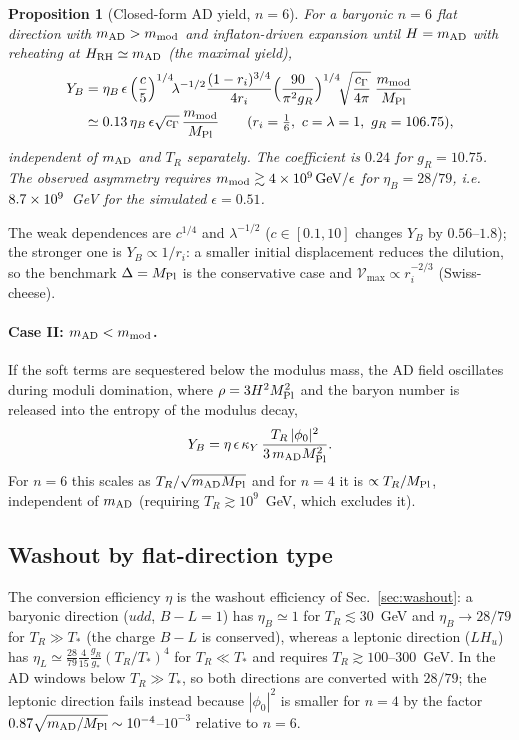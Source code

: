\documentclass[11pt]{article}
\newtheorem{proposition}{Proposition}
\newcommand{\MP}{M_{\rm Pl}}
\begin{document}
\begin{proposition}[Closed-form AD yield, $n=6$]\label{prop:AD}
For a baryonic $n=6$ flat direction with $m_{\rm AD}>m_{\rm mod}$ and inflaton-driven expansion until $H=m_{\rm AD}$ with reheating at $H_{\rm RH}\simeq m_{\rm AD}$ (the maximal yield),
\begin{align}
Y_B&=\eta_B\,\epsilon\,\Big(\frac c5\Big)^{1/4}\!\lambda^{-1/2}\frac{(1-r_i)^{3/4}}{4r_i}\Big(\frac{90}{\pi^2g_R}\Big)^{1/4}\!\sqrt{\frac{c_\Gamma}{4\pi}}\;\frac{m_{\rm mod}}{\MP}\nonumber\\
&\simeq0.13\,\eta_B\,\epsilon\sqrt{c_\Gamma}\,\frac{m_{\rm mod}}{\MP}\qquad(r_i=\tfrac16,\ c=\lambda=1,\ g_R=106.75),
\end{align}
independent of $m_{\rm AD}$ and $T_R$ separately. The coefficient is $0.24$ for $g_R=10.75$. The observed asymmetry requires $m_{\rm mod}\gtrsim4\times10^{9}\,\mathrm{GeV}/\epsilon$ for $\eta_B=28/79$, i.e.\ $8.7\times10^{9}$~GeV for the simulated $\epsilon=0.51$.
\end{proposition}
The weak dependences are $c^{1/4}$ and $\lambda^{-1/2}$ ($c\in[0.1,10]$ changes $Y_B$ by $0.56$--$1.8$); the stronger one is $Y_B\propto1/r_i$: a smaller initial displacement reduces the dilution, so the benchmark $\Delta=\MP$ is the conservative case and $\mathcal V_{\max}\propto r_i^{-2/3}$ (Swiss-cheese).

\paragraph{Case II: $m_{\rm AD}<m_{\rm mod}$.} If the soft terms are sequestered below the modulus mass, the AD field oscillates during moduli domination, where $\rho=3H^2\MP^2$ and the baryon number is released into the entropy of the modulus decay,
\begin{equation}
Y_B=\eta\,\epsilon\,\kappa_Y\,\frac{T_R\,|\phi_0|^2}{3\,m_{\rm AD}\MP^2}.\label{eq:YBII}
\end{equation}
For $n=6$ this scales as $T_R/\sqrt{m_{\rm AD}\MP}$ and for $n=4$ it is $\propto T_R/\MP$, independent of $m_{\rm AD}$ (requiring $T_R\gtrsim10^{9}$~GeV, which excludes it).

\subsection{Washout by flat-direction type}
The conversion efficiency $\eta$ is the washout efficiency of Sec.~\ref{sec:washout}: a baryonic direction ($udd$, $B-L=1$) has $\eta_B\simeq1$ for $T_R\lesssim30$~GeV and $\eta_B\to28/79$ for $T_R\gg T_*$ (the charge $B-L$ is conserved), whereas a leptonic direction ($LH_u$) has $\eta_L\simeq\tfrac{28}{79}\tfrac{4}{15}\tfrac{g_R}{g_*}(T_R/T_*)^4$ for $T_R\ll T_*$ and requires $T_R\gtrsim100$--$300$~GeV. In the AD windows below $T_R\gg T_*$, so both directions are converted with $28/79$; the leptonic direction fails instead because $|\phi_0|^2$ is smaller for $n=4$ by the factor $0.87\sqrt{m_{\rm AD}/\MP}\sim10^{-4}$--$10^{-3}$ relative to $n=6$.
\end{document}
